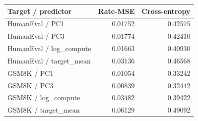 \begin{tabular}{lrr}
\toprule
Target / predictor & Rate-MSE & Cross-entropy\\
\midrule
HumanEval / PC1 & 0.01752 & 0.42575\\
HumanEval / PC3 & 0.01774 & 0.42410\\
HumanEval / log\_compute & 0.01663 & 0.40930\\
HumanEval / target\_mean & 0.03136 & 0.46568\\
GSM8K / PC1 & 0.01054 & 0.33242\\
GSM8K / PC3 & 0.00839 & 0.32442\\
GSM8K / log\_compute & 0.03482 & 0.39422\\
GSM8K / target\_mean & 0.06129 & 0.49092\\
\bottomrule
\end{tabular}
